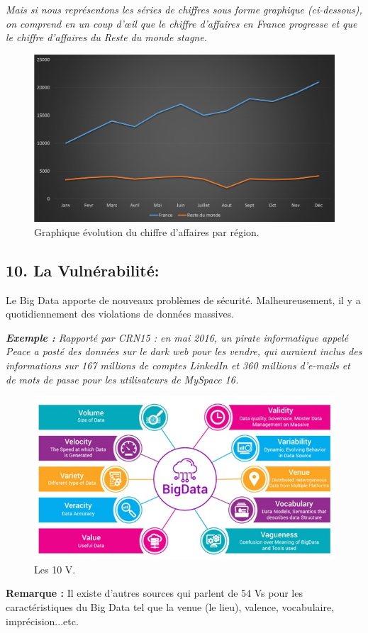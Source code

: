 \textit{Mais si nous représentons les séries de chiffres sous forme graphique (ci-dessous), on comprend en un coup d'œil que le chiffre d'affaires en France progresse et que le chiffre d'affaires du Reste du monde stagne.}

\begin{figure}[h]
	\centering
	\includegraphics[scale=0.5]{img/part1/1.5}
	\caption{Graphique évolution du chiffre d'affaires par région.}
\end{figure}

\subsection*{10. La Vulnérabilité:}
Le Big Data apporte de nouveaux problèmes de sécurité. Malheureusement, il y a quotidiennement des violations de données massives.

\textit{\textbf{Exemple :} Rapporté par CRN15 : en mai 2016, un pirate informatique appelé Peace a posté des données sur le dark web pour les vendre, qui auraient inclus des informations sur 167 millions de comptes LinkedIn et 360 millions d'e-mails et de mots de passe pour les utilisateurs de MySpace 16.}

\begin{figure}[h]
	\centering
	\includegraphics[scale=0.5]{img/part1/1.6}
	\caption{Les 10 V.}
\end{figure}

\textbf{Remarque :} Il existe d'autres sources qui parlent de 54 Vs pour les caractéristiques du Big Data tel que la venue (le lieu), valence, vocabulaire, imprécision...etc.






